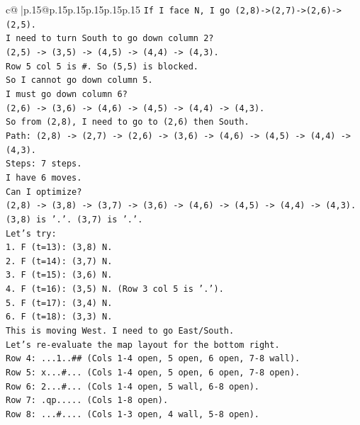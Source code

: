\documentclass{article}
\begin{document}
{\begin{supertabular}{c@{$\;$}|p{.15\linewidth}@{}p{.15\linewidth}p{.15\linewidth}p{.15\linewidth}p{.15\linewidth}p{.15\linewidth}}
{{{\texttt{If I face N, I go (2,8){-}>(2,7){-}>(2,6){-}>(2,5).} \\
\texttt{I need to turn South to go down column 2?} \\
\texttt{(2,5) {-}> (3,5) {-}> (4,5) {-}> (4,4) {-}> (4,3).} \\
\texttt{Row 5 col 5 is \#. So (5,5) is blocked.} \\
\texttt{So I cannot go down column 5.} \\
\texttt{I must go down column 6?} \\
\texttt{(2,6) {-}> (3,6) {-}> (4,6) {-}> (4,5) {-}> (4,4) {-}> (4,3).} \\
\texttt{So from (2,8), I need to go to (2,6) then South.} \\
\texttt{Path: (2,8) {-}> (2,7) {-}> (2,6) {-}> (3,6) {-}> (4,6) {-}> (4,5) {-}> (4,4) {-}> (4,3).} \\
\texttt{Steps: 7 steps.} \\
\texttt{I have 6 moves.} \\
\texttt{Can I optimize?} \\
\texttt{(2,8) {-}> (3,8) {-}> (3,7) {-}> (3,6) {-}> (4,6) {-}> (4,5) {-}> (4,4) {-}> (4,3).} \\
\texttt{(3,8) is '.'. (3,7) is '.'.} \\
\texttt{Let's try:} \\
\texttt{1. F (t=13): (3,8) N.} \\
\texttt{2. F (t=14): (3,7) N.} \\
\texttt{3. F (t=15): (3,6) N.} \\
\texttt{4. F (t=16): (3,5) N. (Row 3 col 5 is '.').} \\
\texttt{5. F (t=17): (3,4) N.} \\
\texttt{6. F (t=18): (3,3) N.} \\
\texttt{This is moving West. I need to go East/South.} \\
\texttt{Let's re{-}evaluate the map layout for the bottom right.} \\
\texttt{Row 4: ...1..\#\# (Cols 1{-}4 open, 5 open, 6 open, 7{-}8 wall).} \\
\texttt{Row 5: x...\#... (Cols 1{-}4 open, 5 open, 6 open, 7{-}8 open).} \\
\texttt{Row 6: 2...\#... (Cols 1{-}4 open, 5 wall, 6{-}8 open).} \\
\texttt{Row 7: .qp..... (Cols 1{-}8 open).} \\
\texttt{Row 8: ...\#.... (Cols 1{-}3 open, 4 wall, 5{-}8 open).} \\
}}}
\end{supertabular}}
\end{document}
